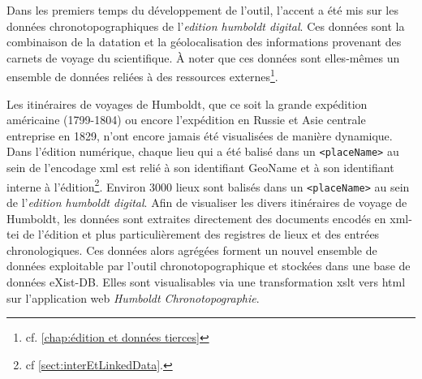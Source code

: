 \documentclass[a4paper, 12pt, twoside]{book}
\begin{document}
Dans les premiers temps du développement de l'outil, l'accent a été mis sur les données chronotopographiques de l'\textit{edition humboldt digital}. Ces données sont la combinaison de la datation et la géolocalisation des informations provenant des carnets de voyage du scientifique. À noter que ces données sont elles-mêmes un ensemble de données reliées à des ressources externes\footnote{cf. \autoref{chap:édition et données tierces}}.

Les itinéraires de voyages de Humboldt, que ce soit la grande expédition américaine (1799-1804) ou encore l'expédition en Russie et Asie centrale entreprise en 1829, n'ont encore jamais été visualisées de manière dynamique. Dans l'édition numérique, chaque lieu qui a été balisé dans un \texttt{<placeName>} au sein de l'encodage \gls{xml} est relié à son identifiant GeoName et à son identifiant interne à l'édition\footnote{cf \autoref{sect:interEtLinkedData}.}. Environ 3000 lieux sont balisés dans un \texttt{<placeName>} au sein de l'\textit{edition humboldt digital}. Afin de visualiser les divers itinéraires de voyage de Humboldt, les données sont extraites directement des documents encodés en \gls{xml}-\gls{tei} de l'édition et plus particulièrement des registres de lieux et des entrées chronologiques. Ces données alors agrégées forment un nouvel ensemble de données exploitable par l'outil chronotopographique et stockées dans une base de données eXist-DB. Elles sont visualisables via une transformation \gls{xsl}t vers \gls{html} sur l'application web \textit{Humboldt Chronotopographie}.
\end{document}
